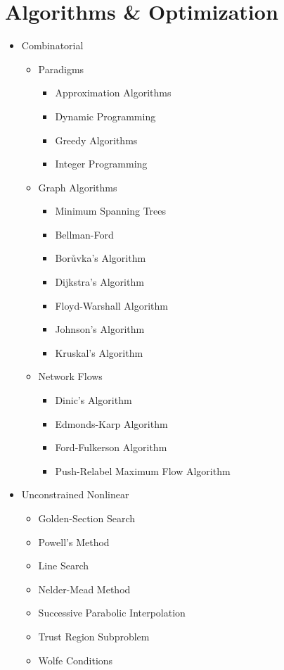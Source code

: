 \documentclass[a4paper]{article}
\begin{document}
\section{Algorithms \& Optimization}
\begin{itemize}
\item Combinatorial
  \begin{itemize}
  \item Paradigms
    \begin{itemize}
    \item Approximation Algorithms
    \item Dynamic Programming
    \item Greedy Algorithms
    \item Integer Programming
    \end{itemize}
  \item Graph Algorithms
    \begin{itemize}
    \item Minimum Spanning Trees
    \item Bellman-Ford
    \item Bor{{\r u}}vka's Algorithm
    \item Dijkstra's Algorithm
    \item Floyd-Warshall Algorithm
    \item Johnson's Algorithm
    \item Kruskal's Algorithm
    \end{itemize}
  \item Network Flows
    \begin{itemize}
    \item Dinic's Algorithm
    \item Edmonds-Karp Algorithm
    \item Ford-Fulkerson Algorithm
    \item Push-Relabel Maximum Flow Algorithm
    \end{itemize}
  \end{itemize}
\item Unconstrained Nonlinear
  \begin{itemize}
  \item Golden-Section Search
  \item Powell's Method
  \item Line Search
  \item Nelder-Mead Method
  \item Successive Parabolic Interpolation
  \item Trust Region Subproblem
  \item Wolfe Conditions

\end{itemize}
\end{itemize}
\end{document}

